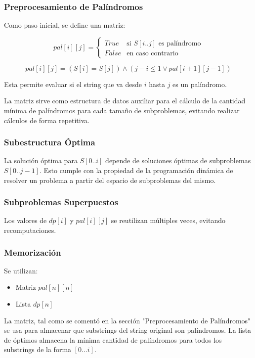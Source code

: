 \subsubsection{Preprocesamiento de Palíndromos}

Como paso inicial, se define una matriz:

\[
pal[i][j] =
\begin{cases}
True & \text{si } S[i..j] \text{ es palíndromo} \\
False & \text{en caso contrario}
\end{cases}
\]

\[
pal[i][j] = (S[i] = S[j]) \land (j - i \leq 1 \lor pal[i+1][j-1])
\]

Esta permite evaluar si el string que va desde $i$ hasta $j$ es un palíndromo. 

La matriz sirve como estructura de datos auxiliar para el cálculo de la cantidad mínima de palíndromos para cada tamaño  de subproblemas, evitando 
realizar cálculos de forma repetitiva.

\subsubsection{Subestructura Óptima}

La solución óptima para $S[0..i]$ depende de soluciones óptimas de subproblemas $S[0..j-1]$. Esto cumple con la propiedad de la programación dinámica
de resolver un problema a partir del espacio de subproblemas del mismo.

\subsubsection{Subproblemas Superpuestos}

Los valores de $dp[i]$ y $pal[i][j]$ se reutilizan múltiples veces, evitando recomputaciones.

\subsubsection{Memorización}

Se utilizan:
\begin{itemize}
    \item Matriz $pal[n][n]$
    \item Lista $dp[n]$
\end{itemize}

La matriz, tal como se comentó en la sección "Preprocesamiento de Palíndromos" se usa para almacenar que substrings del string original son 
palíndromos. La lista de óptimos almacena la mínima cantidad de palíndromos para todos los substrings de la forma $[0...i]$.

